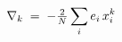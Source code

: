 \documentclass[preview]{standalone}
\begin{document}
\begin{align*}
\special{dvisvgm:raw <g id='unique000'>}\nabla_k \;=\; -\tfrac{2}{N}\sum_i e_i\, x_i^k\special{dvisvgm:raw </g>}
\end{align*}
\end{document}
